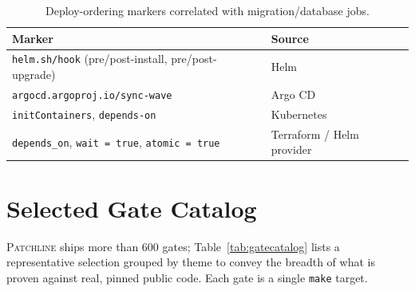 \documentclass[11pt]{article}
\newcommand{\tool}{\textsc{Patchline}}
\newcommand{\code}[1]{\texttt{#1}}
\begin{document}
\begin{table}[h]\centering\small
\caption{Deploy-ordering markers correlated with migration/database jobs.}
\label{tab:ordering}
\begin{tabular}{>{\raggedright\arraybackslash}p{6.0cm}>{\raggedright\arraybackslash}p{6.0cm}}
\toprule
\textbf{Marker} & \textbf{Source} \\
\midrule
\code{helm.sh/hook} (pre/post-install, pre/post-upgrade) & Helm \\
\code{argocd.argoproj.io/sync-wave} & Argo CD \\
\code{initContainers}, \code{depends-on} & Kubernetes \\
\code{depends\_on}, \code{wait = true}, \code{atomic = true} & Terraform / Helm provider \\
\bottomrule
\end{tabular}
\end{table}

\section{Selected Gate Catalog}
\label{app:gates}

\tool{} ships more than 600 gates; Table~\ref{tab:gatecatalog} lists a representative selection grouped by
theme to convey the breadth of what is proven against real, pinned public code. Each gate is a single
\code{make} target.
\end{document}
